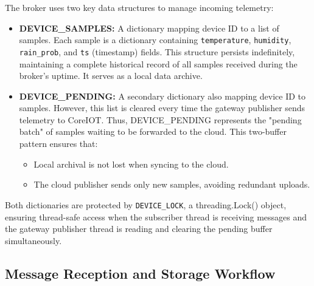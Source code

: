 The broker uses two key data structures to manage incoming telemetry:
\begin{itemize}
  \item \textbf{DEVICE\_SAMPLES:} A dictionary mapping device ID to a list of samples. Each sample is a dictionary containing \texttt{temperature}, \texttt{humidity}, \texttt{rain\_prob}, and \texttt{ts} (timestamp) fields. This structure persists indefinitely, maintaining a complete historical record of all samples received during the broker's uptime. It serves as a local data archive.
  \item \textbf{DEVICE\_PENDING:} A secondary dictionary also mapping device ID to samples. However, this list is cleared every time the gateway publisher sends telemetry to CoreIOT. Thus, DEVICE\_PENDING represents the "pending batch" of samples waiting to be forwarded to the cloud. This two-buffer pattern ensures that:
    \begin{itemize}
      \item Local archival is not lost when syncing to the cloud.
      \item The cloud publisher sends only new samples, avoiding redundant uploads.
    \end{itemize}
\end{itemize}

Both dictionaries are protected by \texttt{DEVICE\_LOCK}, a threading.Lock() object, ensuring thread-safe access when the subscriber thread is receiving messages and the gateway publisher thread is reading and clearing the pending buffer simultaneously.

\subsection*{Message Reception and Storage Workflow}


